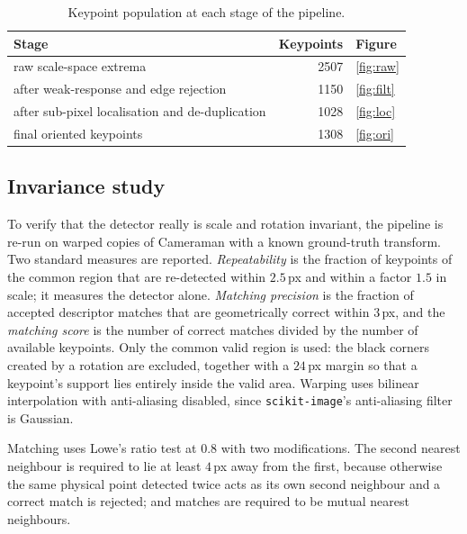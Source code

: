 \documentclass[11pt,a4paper]{article}
\newcommand{\Nraw}{2507}          %
\newcommand{\Nfilt}{1150}         %
\newcommand{\Nloc}{1028}          %
\newcommand{\Nori}{1308}          %
\begin{document}
\begin{table}[ht]
\centering
\small
\begin{tabular}{@{}lrl@{}}
\toprule
Stage & Keypoints & Figure \\
\midrule
raw scale-space extrema                       & \Nraw  & \ref{fig:raw} \\
after weak-response and edge rejection        & \Nfilt & \ref{fig:filt} \\
after sub-pixel localisation and de-duplication & \Nloc  & \ref{fig:loc} \\
final oriented keypoints                      & \Nori  & \ref{fig:ori} \\
\bottomrule
\end{tabular}
\caption{Keypoint population at each stage of the pipeline.}
\label{tab:counts}
\end{table}

\subsection{Invariance study}

To verify that the detector really is scale and rotation invariant, the
pipeline is re-run on warped copies of Cameraman with a known ground-truth
transform. Two standard measures are reported. \emph{Repeatability} is the
fraction of keypoints of the common region that are re-detected within
$2.5$\,px and within a factor $1.5$ in scale; it measures the detector alone.
\emph{Matching precision} is the fraction of accepted descriptor matches that
are geometrically correct within $3$\,px, and the \emph{matching score} is the
number of correct matches divided by the number of available keypoints. Only
the common valid region is used: the black corners created by a rotation are
excluded, together with a $24$\,px margin so that a keypoint's support lies
entirely inside the valid area. Warping uses bilinear interpolation with
anti-aliasing disabled, since \texttt{scikit-image}'s anti-aliasing filter is
Gaussian.

Matching uses Lowe's ratio test at $0.8$ with two modifications. The second
nearest neighbour is required to lie at least $4$\,px away from the first,
because otherwise the same physical point detected twice acts as its own
second neighbour and a correct match is rejected; and matches are required to
be mutual nearest neighbours.
\end{document}
